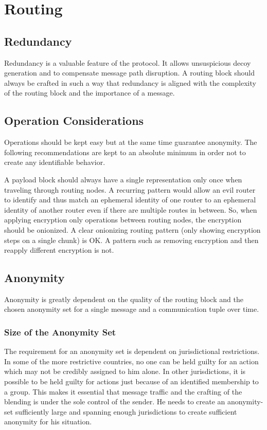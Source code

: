 \section{Routing}

\subsection{Redundancy}
Redundancy is a valuable feature of the protocol. It allows unsuspicious decoy generation and to compensate message path disruption. A routing block should always be crafted in such a way that redundancy is aligned with the complexity of the routing block and the importance of a message.

\subsection{Operation Considerations}
Operations should be kept easy but at the same time guarantee anonymity. The following recommendations are kept to an absolute minimum in order not to create any identifiable behavior.

A payload block should always have a single representation only once when traveling through routing nodes. A recurring pattern would allow an evil router to identify and thus match an ephemeral identity of one router to an ephemeral identity of another router even if there are multiple routes in between. So, when applying encryption only operations between routing nodes, the encryption should be onionized. A clear onionizing routing pattern (only showing encryption steps on a single chunk) is OK. A pattern such as removing encryption and then reapply different encryption is not.

\subsection{Anonymity}
Anonymity is greatly dependent on the quality of the routing block and the chosen anonymity set for a single message and a communication tuple over time. 

\subsubsection{Size of the Anonymity Set}
The requirement for an anonymity set is dependent on jurisdictional restrictions. In some of the more restrictive countries, no one can be held guilty for an action which may not be credibly assigned to him alone. In other jurisdictions, it is possible to be held guilty for actions just because of an identified membership to a group. This makes it essential that message traffic and the crafting of the blending is under the sole control of the sender. He needs to create an anonymity-set sufficiently large and spanning enough jurisdictions to create sufficient anonymity for his situation.

